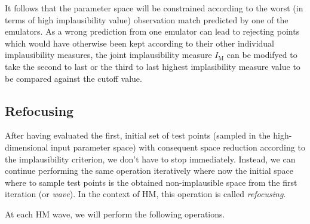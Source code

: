 \noindent
It follows that the parameter space will be constrained according to the worst (in terms of high implausibility value) observation match predicted by one of the emulators. As a wrong prediction from one emulator can lead to rejecting points which would have otherwise been kept according to their other individual implausibility measures, the joint implausibility measure $I_{\text{M}}$ can be modifyed to take the second to last or the third to last highest implasibility measure value to be compared against the cutoff value.


%
%
%
\subsection{Refocusing}
After having evaluated the first, initial set of test points (sampled in the high-dimensional input parameter space) with consequent space reduction according to the implausibility criterion, we don't have to stop immediately. Instead, we can continue performing the same operation iteratively where now the initial space where to sample test points is the obtained non-implausible space from the first iteration (or \textit{wave}). In the context of HM, this operation is called \textit{refocusing}.

\vspace{0.2cm}\noindent
At each HM wave, we will perform the following operations.

